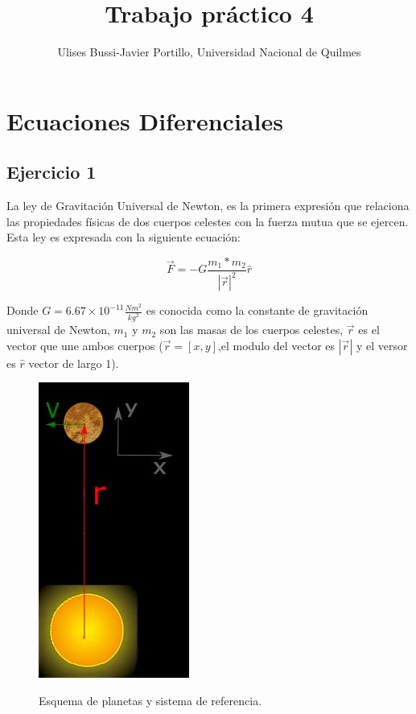 \documentclass[a4paper,11pt]{article}
\makeatletter
\theoremstyle{mytheor}
\renewcommand{\maketitle}{
\colorbox{gray!20}{\framebox[\linewidth]{ \huge \textsc{\@title} } 
\lfoot{\@title}
}

}
\makeatother
\begin{document}
\title{Trabajo práctico 4}

\author{Ulises Bussi-Javier Portillo, Universidad Nacional de Quilmes}


\maketitle \vspace{20pt}



\section*{Ecuaciones Diferenciales}

\subsection*{Ejercicio 1}
La ley de Gravitación Universal de Newton, es la primera expresión que relaciona las propiedades físicas de dos cuerpos celestes con la fuerza mutua que se ejercen.  Esta ley es expresada con la siguiente ecuación:

\begin{equation*}
  \vec F = -G \frac{m_1 * m_2}{|\vec r|^2} \hat r
\end{equation*}

Donde $G=6.67\times10^{-11} \frac{N m^2}{{kg}^2} $ es conocida como la constante de gravitación universal de Newton, $m_1$ y $m_2$ son las masas de los cuerpos celestes, $\vec r$ es el vector que une ambos cuerpos ($\vec r = [x,y]$,el modulo del vector es $|\vec r|$ y el versor es $\hat r$ vector de largo 1).

\begin{figure}[h]
\centering
\includegraphics[width=.3\linewidth]{f1_p.jpeg}
\label{fig:f1}
\caption{Esquema de planetas y sistema de referencia.}

\end{figure}
\end{document}
